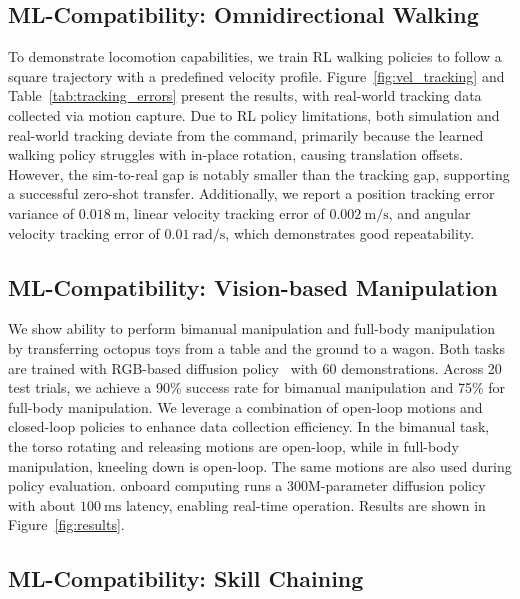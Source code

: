 


\subsection{ML-Compatibility: Omnidirectional Walking}

To demonstrate \systems locomotion capabilities, we train RL walking policies to follow a square trajectory with a predefined velocity profile. Figure~\ref{fig:vel_tracking} and Table~\ref{tab:tracking_errors} present the results, with real-world tracking data collected via motion capture. Due to RL policy limitations, both simulation and real-world tracking deviate from the command, primarily because the learned walking policy struggles with in-place rotation, causing translation offsets. However, the sim-to-real gap is notably smaller than the tracking gap, supporting a successful zero-shot transfer. Additionally, we report a position tracking error variance of $0.018~\mathrm{m}$, linear velocity tracking error of $0.002~\mathrm{m/s}$, and angular velocity tracking error of $0.01~\mathrm{rad/s}$, which demonstrates good repeatability. 

% 

\subsection{ML-Compatibility: Vision-based Manipulation}

We show \systems ability to perform bimanual manipulation and full-body manipulation by transferring octopus toys from a table and the ground to a wagon. Both tasks are trained with RGB-based diffusion policy~\citep{chi2023diffusion} with 60 demonstrations. Across 20 test trials, we achieve a 90\% success rate for bimanual manipulation and 75\% for full-body manipulation. We leverage a combination of open-loop motions and closed-loop policies to enhance data collection efficiency. In the bimanual task, the torso rotating and releasing motions are open-loop, while in full-body manipulation, kneeling down is open-loop. The same motions are also used during policy evaluation.
\systems onboard computing runs a 300M-parameter diffusion policy with about $100~\mathrm{ms}$ latency, enabling real-time operation. 
Results are shown in Figure~\ref{fig:results}.

\subsection{ML-Compatibility: Skill Chaining}

